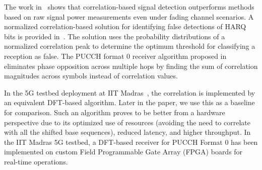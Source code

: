 \documentclass[journal]{IEEEtran}
\begin{document}
The work in~\cite{kim2020performance} shows that correlation-based signal detection outperforms methods based on raw signal power measurements even under fading channel scenarios. A normalized correlation-based solution for identifying false detections of HARQ bits is provided in~\cite{tadavarty2021performance}. The solution uses the probability distributions of a normalized correlation peak to determine the optimum threshold for classifying a reception as false. The PUCCH format 0 receiver algorithm proposed in~\cite{phan2021enhanced} eliminates phase opposition across multiple hops by finding the sum of correlation magnitudes across symbols instead of correlation values. 

In the 5G testbed deployment at IIT Madras~\cite{5gtbiitm}, the correlation is implemented by an equivalent DFT-based algorithm. Later in the paper, we use this as a baseline for comparison. Such an algorithm proves to be better from a hardware perspective due to its optimized use of resources (avoiding the need to correlate with all the shifted base sequences), reduced latency, and higher throughput. In the IIT Madras 5G testbed, a DFT-based receiver for PUCCH Format 0 has been implemented on custom Field Programmable Gate Array (FPGA) boards for real-time operations.
\end{document}
